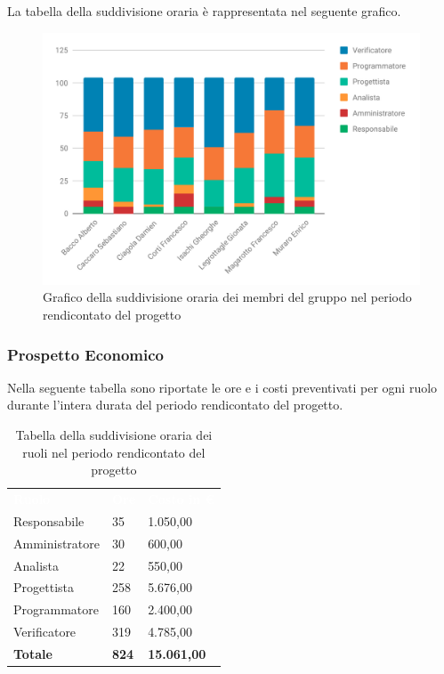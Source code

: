 La tabella della suddivisione oraria è rappresentata nel seguente grafico.
\begin{figure}[H]
	\includegraphics[width=1\linewidth]{Preventivo/grafici/TR1.pdf}
	\caption{Grafico della suddivisione oraria dei membri del gruppo nel periodo rendicontato del progetto}
\end{figure}

\subsubsection{Prospetto Economico}
Nella seguente tabella sono riportate le ore e i costi preventivati per ogni ruolo durante l'intera durata del periodo rendicontato del progetto.


\begin{table}[H]	
	\begin{center}
	    \begin{tabular}{C{4cm}C{1cm}C{3,5cm}}
			\textcolor{white}{\textbf{Ruolo}} & \textcolor{white}{\textbf{Ore}} & \textcolor{white}{\textbf{Costo in €}}
			\\
			Responsabile & 35 & 1.050,00 \\
			Amministratore & 30 & 600,00 \\
			Analista & 22 & 550,00 \\
			Progettista & 258 & 5.676,00 \\
			Programmatore & 160 & 2.400,00 \\
			Verificatore & 319 & 4.785,00 \\
			\textbf{Totale} & \textbf{824} & \textbf{15.061,00} \\
		\end{tabular}
	    \caption{Tabella della suddivisione oraria dei ruoli nel periodo rendicontato del progetto} \label{tab:tabellaRuoliTotale} 
	\end{center}
\end{table}


